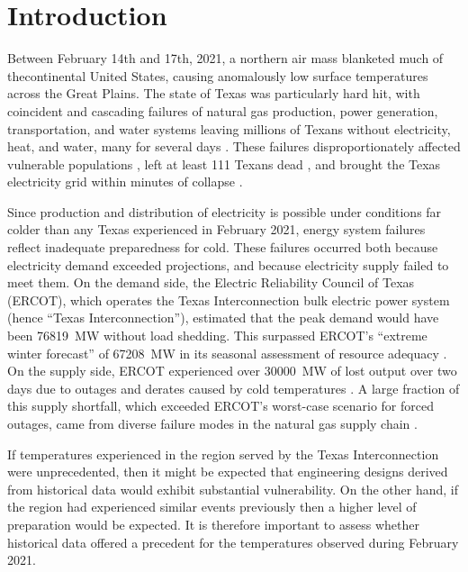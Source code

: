 \documentclass[12pt]{iopart}
\begin{document}
\section{Introduction}

Between February 14th and 17th, 2021, a  northern air mass blanketed much of thecontinental United States, causing anomalously low surface temperatures across the Great Plains.
The state of Texas was particularly hard hit, with coincident and cascading failures of natural gas production, power generation, transportation, and water systems leaving millions of Texans without electricity, heat, and water, many for several days \cite{ceser_winterupdate:2021,clack_uri:2021,smead_eyesoftx:2021}.
These failures disproportionately affected vulnerable populations \cite{dobbins_blackoutdisparity:2021}, left at least 111 Texans dead \cite{mulcahy_urideath:2021}, and brought the Texas electricity grid within minutes of collapse \cite{magness_review:2021}.

Since production and distribution of electricity is possible under conditions far colder than any Texas experienced in February 2021, energy system failures reflect inadequate preparedness for cold.
These failures occurred both because electricity demand exceeded projections, and because electricity supply failed to meet them.
On the demand side, the Electric Reliability Council of Texas (ERCOT), which operates the Texas Interconnection bulk electric power system (hence ``Texas Interconnection''), estimated that the peak demand would have been \SI{76819}{\mega\watt} without load shedding.
This surpassed ERCOT's ``extreme winter forecast'' of \SI{67208}{\mega\watt} in its seasonal assessment of resource adequacy \cite{ercotpublic_sarawinter:2020}.
On the supply side, ERCOT experienced over \SI{30000}{\mega\watt} of lost output over two days due to outages and derates caused by cold temperatures \cite{ercotpublic_outagesv2:2021}.
A large fraction of this supply shortfall, which exceeded ERCOT's worst-case scenario for forced outages, came from diverse failure modes in the natural gas supply chain \cite{ercotpublic_outagesv2:2021,smead_eyesoftx:2021,ceser_winterupdate:2021}.

If temperatures experienced in the region served by the Texas Interconnection were unprecedented, then it might be expected that engineering designs derived from  historical data would exhibit substantial vulnerability.
On the other hand, if the region had experienced similar events previously then a higher level of preparation would be expected.
It is therefore important to assess whether historical data offered a precedent for the temperatures observed during February 2021.
\end{document}
